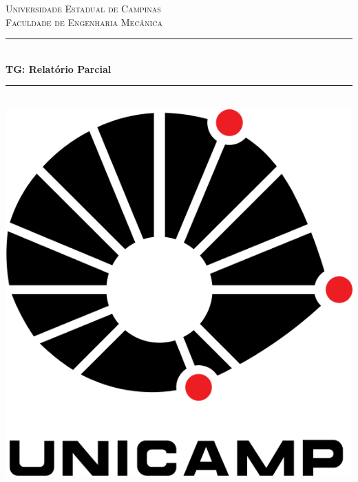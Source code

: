 \documentclass[12pt]{article} %
\begin{document}

\begin{titlepage}

\newcommand{\HRule}{\rule{\linewidth}{0.5mm}} %

\center %

\textsc{\LARGE Universidade Estadual de Campinas}\\[1.5cm] %
\textsc{\Large Faculdade de Engenharia Mecânica}\\[0.5cm] %

\HRule \\[0.4cm]
{ \huge \bfseries TG: Relatório Parcial}\\[0.4cm] %
\HRule \\[1cm]

\includegraphics[scale=0.3]{pictures/unicamp.png}\\
\vspace{12mm}



\end{titlepage}
\end{document}
